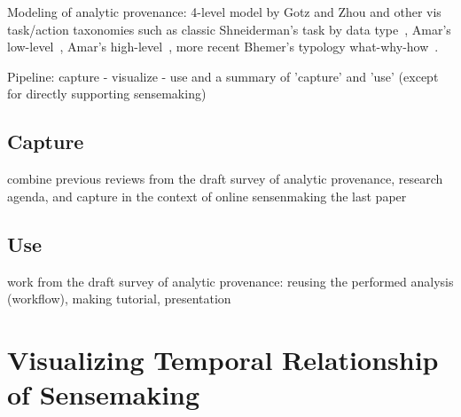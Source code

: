 Modeling of analytic provenance: 4-level model by Gotz and Zhou and other vis task/action taxonomies such as classic Shneiderman's task by data type~\cite{Shneiderman1996}, Amar's low-level~\cite{Amar2005}, Amar's high-level~\cite{Amar2004}, more recent Bhemer's typology what-why-how~\cite{Brehmer2013}.

Pipeline: capture - visualize - use and a summary of 'capture' and 'use' (except for directly supporting sensemaking)

\subsection{Capture}
combine previous reviews from the draft survey of analytic provenance, research agenda, and capture in the context of online sensenmaking the last paper
\subsection{Use}
work from the draft survey of analytic provenance: reusing the performed analysis (workflow), making tutorial, presentation

\section{Visualizing Temporal Relationship of Sensemaking}
